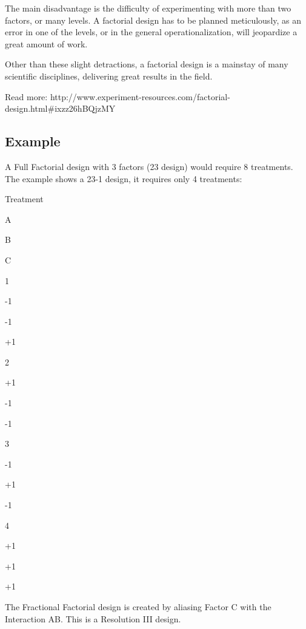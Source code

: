 \documentclass[]{article}
\begin{document}
The main disadvantage is the difficulty of experimenting with more than two factors, or many levels. A factorial design has to be planned meticulously, as an error in one of the levels, or in the general operationalization, will jeopardize a great amount of work.

Other than these slight detractions, a factorial design is a mainstay of many scientific disciplines, delivering great results in the field.



Read more: http://www.experiment-resources.com/factorial-design.html#ixzz26hBQjzMY


\subsection{Example}

A Full Factorial design with 3 factors (23 design) would require 8 treatments. The example shows a 23-1 design, it requires only 4 treatments:












Treatment
 

A
 

B
 

C
 



1
 

-1
 

-1
 

+1
 



2
 

+1
 

-1
 

-1
 



3
 

-1
 

+1
 

-1
 



4
 

+1
 

+1
 

+1
 




The Fractional Factorial design is created by aliasing Factor C with the Interaction AB. This is a Resolution III design.
\end{document}
